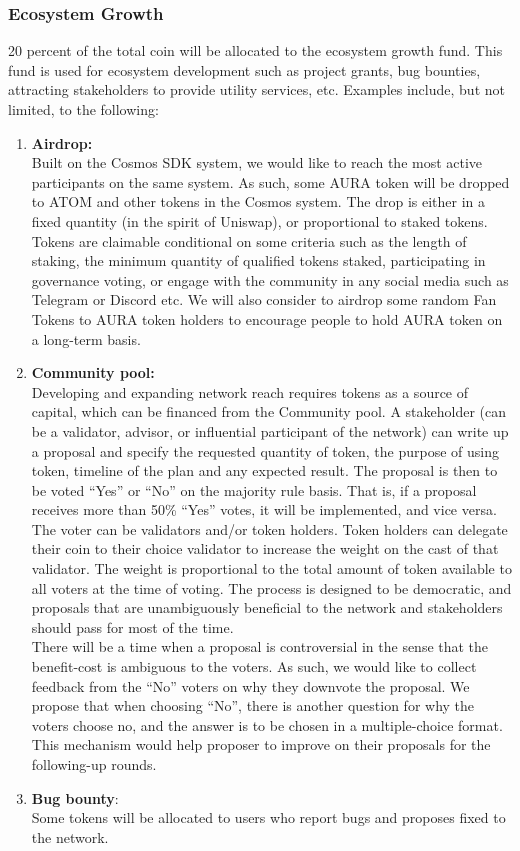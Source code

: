 \documentclass[11pt, titlepage]{article}
\begin{document}
\subsubsection{Ecosystem Growth}
20 percent of the total coin will be allocated to the ecosystem growth fund. This fund is used for ecosystem development such as project grants, bug bounties, attracting stakeholders to provide utility services, etc. Examples include, but not limited, to the following: 

\begin{enumerate}
\item \textbf{Airdrop:} \\ 
Built on the Cosmos SDK system, we would like to reach the most active participants on the same system. As such, some AURA token will be dropped to ATOM and other tokens in the Cosmos system. The drop is either in a fixed quantity (in the spirit of Uniswap), or proportional to staked tokens. Tokens are claimable conditional on some criteria such as the length of staking, the minimum quantity of qualified tokens staked, participating in governance voting, or engage with the community in any social media such as Telegram or Discord etc. We will also consider to airdrop some random Fan Tokens to AURA token holders to encourage people to hold AURA token on a long-term basis.
\item \textbf{Community pool:} \\
Developing and expanding network reach requires tokens as a source of capital, which can be financed from the Community pool. A stakeholder (can be a validator, advisor, or influential participant of the network) can write up a proposal and specify the requested quantity of token, the purpose of using token, timeline of the plan and any expected result.  
The proposal is then to be voted “Yes” or “No” on the majority rule basis. That is, if a proposal receives more than 50\% “Yes” votes, it will be implemented, and vice versa. The voter can be validators and/or token holders. Token holders can delegate their coin to their choice validator to increase the weight on the cast of that validator. The weight is proportional to the total amount of token available to all voters at the time of voting. The process is designed to be democratic, and proposals that are unambiguously beneficial to the network and stakeholders should pass for most of the time.\\
There will be a time when a proposal is controversial in the sense that the benefit-cost is ambiguous to the voters. As such, we would like to collect feedback from the “No” voters on why they downvote the proposal. We propose that when choosing “No”, there is another question for why the voters choose no, and the answer is to be chosen in a multiple-choice format. This mechanism would help proposer to improve on their proposals for the following-up rounds.
 
\item \textbf{Bug bounty}: \\ 
Some tokens will be allocated to users who report bugs and proposes fixed to the network.

\end{enumerate}
\end{document}
